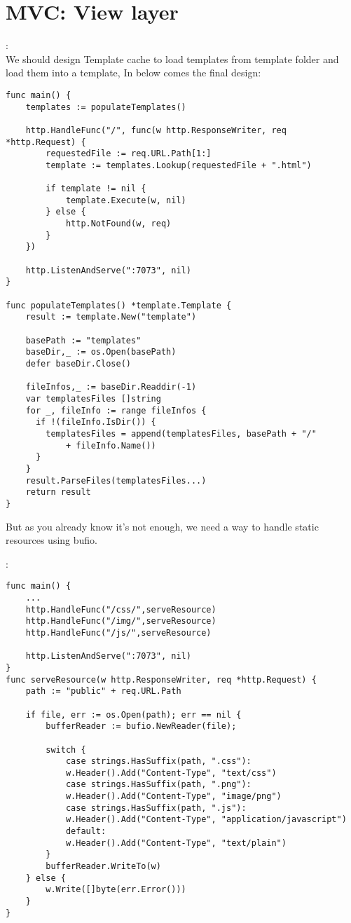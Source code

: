\section{MVC: View layer}
\begin{note}:\\
We should design Template cache to load templates from template folder and load them into a template, In below comes the final design:
\begin{lstlisting}[language=Golang]
func main() {
	templates := populateTemplates()
	
	http.HandleFunc("/", func(w http.ResponseWriter, req *http.Request) {
		requestedFile := req.URL.Path[1:]
		template := templates.Lookup(requestedFile + ".html")
		
		if template != nil {
			template.Execute(w, nil)
		} else {
			http.NotFound(w, req)
		}
	})

	http.ListenAndServe(":7073", nil)
}

func populateTemplates() *template.Template {
	result := template.New("template")
	
	basePath := "templates"
	baseDir,_ := os.Open(basePath)
	defer baseDir.Close()
	
	fileInfos,_ := baseDir.Readdir(-1)
	var templatesFiles []string
	for _, fileInfo := range fileInfos {
	  if !(fileInfo.IsDir()) {
	    templatesFiles = append(templatesFiles, basePath + "/" 
		    + fileInfo.Name())
	  }
	}
	result.ParseFiles(templatesFiles...)
	return result
}
\end{lstlisting}
But as you already know it's not enough, we need a way to handle static resources using bufio.
\end{note}
\begin{note}:\\
\begin{lstlisting}[language=Golang]
func main() {
	...
	http.HandleFunc("/css/",serveResource)
	http.HandleFunc("/img/",serveResource)
	http.HandleFunc("/js/",serveResource)

	http.ListenAndServe(":7073", nil)
}
func serveResource(w http.ResponseWriter, req *http.Request) {
	path := "public" + req.URL.Path
	
	if file, err := os.Open(path); err == nil {
		bufferReader := bufio.NewReader(file);
		
		switch {
			case strings.HasSuffix(path, ".css"):
			w.Header().Add("Content-Type", "text/css")
			case strings.HasSuffix(path, ".png"):
			w.Header().Add("Content-Type", "image/png")
			case strings.HasSuffix(path, ".js"):
			w.Header().Add("Content-Type", "application/javascript")
			default:
			w.Header().Add("Content-Type", "text/plain")
		}
		bufferReader.WriteTo(w)
	} else {
		w.Write([]byte(err.Error()))
	}
}
\end{lstlisting}
\end{note}
